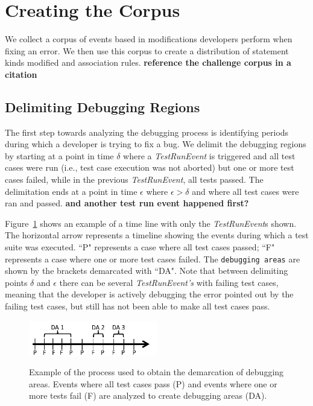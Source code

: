 \documentclass[sigconf]{acmart}
\newcommand{\todo}[1]
  {{\scriptsize \textbf{\color{red} {#1}}}}
\begin{document}
\section{Creating the Corpus}

We collect a corpus of events based in modifications 
developers perform when fixing an error. We then
use this corpus to create a distribution of statement
kinds modified and association rules.\todo{reference the challenge corpus in a citation}

\subsection{Delimiting Debugging Regions}
\label{delimitDebugRegions}


The first step towards analyzing the debugging
process is identifying periods during which a 
developer is trying to fix a bug.
We delimit the debugging regions by starting at a point
in time $\delta$ where a \textit{TestRunEvent} is triggered and 
all test cases were run (i.e., test case execution
was not aborted) but one or more test cases failed, while in the 
previous \textit{TestRunEvent}, all tests passed.
The delimitation ends at a point in time $\epsilon $ where $ \epsilon > \delta$ 
and where all test cases were ran and passed.\todo{and another test run event
  happened first?}

Figure~\ref{demarcations} shows an example of a time line
with only the \textit{TestRunEvent}s shown. The 
horizontal arrow represents a timeline showing
the events during which a test suite was executed. ``P" represents a case
where all test cases passed; ``F" represents a case where one
or more test cases failed. The \texttt{debugging areas} are shown by
the brackets demarcated with ``DA". 
Note that between delimiting points $\delta$ and $\epsilon$ there can be 
several \textit{TestRunEvent's} with failing test cases, meaning
that the developer is actively debugging the error pointed out
by the failing test cases, but still has not been able to make
all test cases pass.

\begin{figure}[h]
\caption{Example of the process used to obtain the demarcation of
debugging areas. Events where all test cases pass (P) and
events where one or more tests fail (F) are analyzed to create
debugging areas (DA).}
\centering
\includegraphics[width=0.5\textwidth]{images/demarcations.png}
\label{demarcations}
\end{figure}
\end{document}
